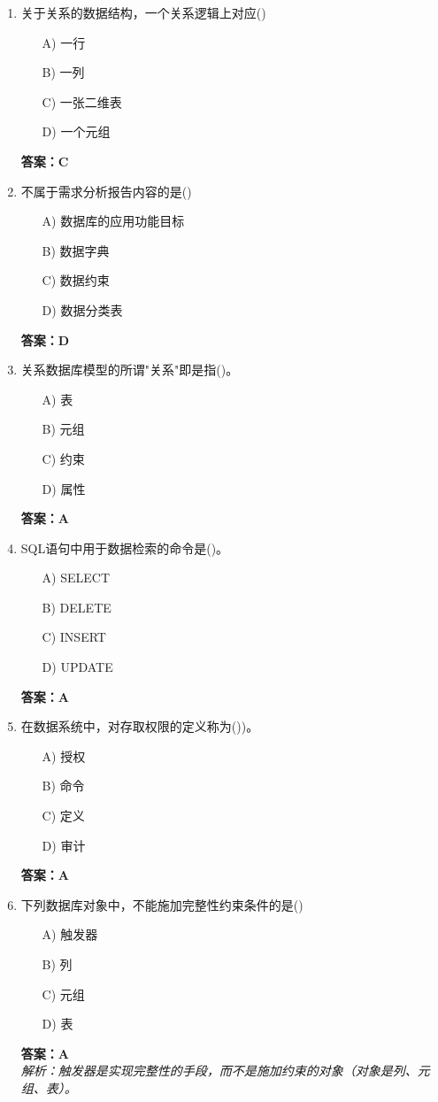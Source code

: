 \documentclass[a4paper,12pt]{article}
\begin{document}
\begin{enumerate}[label=\arabic*.]
\item 关于关系的数据结构，一个关系逻辑上对应()
\begin{itemize}
    \item[A)] 一行
    \item[B)] 一列
    \item[C)] 一张二维表
    \item[D)] 一个元组
\end{itemize}
\textbf{答案：C}

\item 不属于需求分析报告内容的是()
\begin{itemize}
    \item[A)] 数据库的应用功能目标
    \item[B)] 数据字典
    \item[C)] 数据约束
    \item[D)] 数据分类表
\end{itemize}
\textbf{答案：D} 

\item 关系数据库模型的所谓"关系"即是指()。
\begin{itemize}
    \item[A)] 表
    \item[B)] 元组
    \item[C)] 约束
    \item[D)] 属性
\end{itemize}
\textbf{答案：A}

\item SQL语句中用于数据检索的命令是()。
\begin{itemize}
    \item[A)] SELECT
    \item[B)] DELETE
    \item[C)] INSERT
    \item[D)] UPDATE
\end{itemize}
\textbf{答案：A}

\item 在数据系统中，对存取权限的定义称为())。
\begin{itemize}
    \item[A)] 授权
    \item[B)] 命令
    \item[C)] 定义
    \item[D)] 审计
\end{itemize}
\textbf{答案：A}

\item 下列数据库对象中，不能施加完整性约束条件的是()
\begin{itemize}
    \item[A)] 触发器
    \item[B)] 列
    \item[C)] 元组
    \item[D)] 表
\end{itemize}
\textbf{答案：A} \\
\textit{解析：触发器是实现完整性的手段，而不是施加约束的对象（对象是列、元组、表）。}


\end{enumerate}
\end{document}
